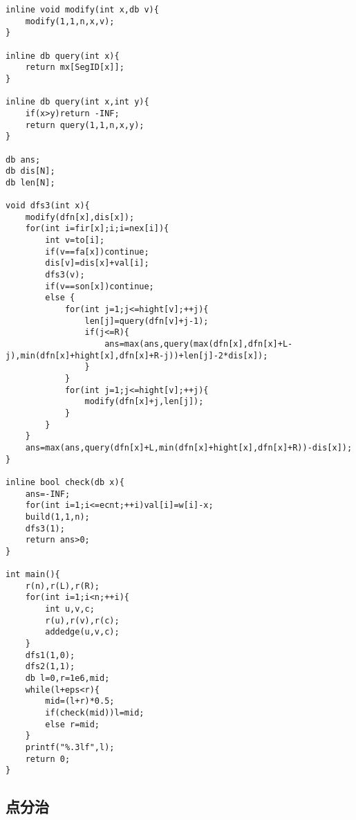 \documentclass{ctexart}
\begin{document}
\begin{lstlisting}
inline void modify(int x,db v){
	modify(1,1,n,x,v);
}

inline db query(int x){
	return mx[SegID[x]];
}

inline db query(int x,int y){
	if(x>y)return -INF;
	return query(1,1,n,x,y);
}

db ans;
db dis[N];
db len[N];

void dfs3(int x){
	modify(dfn[x],dis[x]);
	for(int i=fir[x];i;i=nex[i]){
		int v=to[i];
		if(v==fa[x])continue;
		dis[v]=dis[x]+val[i];
		dfs3(v);
		if(v==son[x])continue;
		else {
			for(int j=1;j<=hight[v];++j){
				len[j]=query(dfn[v]+j-1);
				if(j<=R){
					ans=max(ans,query(max(dfn[x],dfn[x]+L-j),min(dfn[x]+hight[x],dfn[x]+R-j))+len[j]-2*dis[x]);
				}
			}
			for(int j=1;j<=hight[v];++j){
				modify(dfn[x]+j,len[j]);
			}
		}
	}
	ans=max(ans,query(dfn[x]+L,min(dfn[x]+hight[x],dfn[x]+R))-dis[x]);
}

inline bool check(db x){
	ans=-INF;
	for(int i=1;i<=ecnt;++i)val[i]=w[i]-x;
	build(1,1,n);
	dfs3(1);
	return ans>0;
}

int main(){
	r(n),r(L),r(R);
	for(int i=1;i<n;++i){
		int u,v,c;
		r(u),r(v),r(c);
		addedge(u,v,c);
	}
	dfs1(1,0);
	dfs2(1,1);
	db l=0,r=1e6,mid;
	while(l+eps<r){
		mid=(l+r)*0.5;
		if(check(mid))l=mid;
		else r=mid;
	}
	printf("%.3lf",l);
	return 0;
}
\end{lstlisting}
\subsection{点分治}
\end{document}
